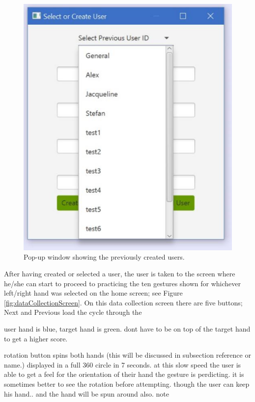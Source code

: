 \begin{figure}[H]
\begin{minipage}{0.45\textwidth}
        \includegraphics[scale=.45]{Figures/6_selectUserDropdown.JPG}%
        \caption{Pop-up window showing the previously created users.}
        \label{fig:selectOldUser}
    \end{minipage}
\end{figure}

After having created or selected a user, the user is taken to the screen where he/she can start to proceed to practicing the ten gestures shown for whichever left/right hand was selected on the home screen; see Figure \ref{fig:dataCollectionScreen}. On this data collection screen there are five buttons; Next and Previous load the cycle through the 

user hand is blue, target hand is green. dont have to be on top of the target hand to get a higher score. 

rotation button spins both hands (this will be discussed in subsection reference or name.)
displayed in a full 360 circle in 7 seconds. at this slow speed the user is able to get a feel for the orientation of their hand the gesture is perdicting. it is sometimes better to see the rotation before attempting. though the user can keep his hand.. and the hand will be spun around also. note














